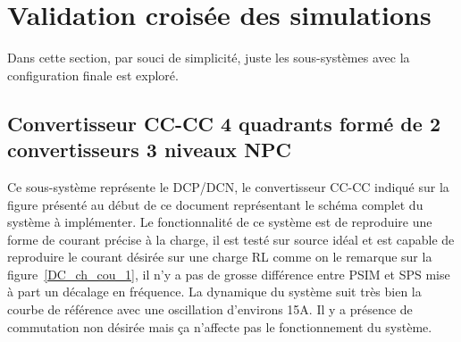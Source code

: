 \chapter{Validation croisée des simulations}
Dans cette section, par souci de simplicité, juste les sous-systèmes avec la configuration finale est exploré. 

\section{Convertisseur CC-CC 4 quadrants formé de 2 convertisseurs 3 niveaux NPC}
Ce sous-système représente le DCP/DCN, le convertisseur CC-CC indiqué sur la figure présenté au début de ce document représentant le schéma complet du système à implémenter. Le fonctionnalité de ce système est de reproduire une forme de courant précise à la charge, il est testé sur source idéal et est capable de  reproduire le courant désirée sur une charge RL comme on le remarque sur la figure~\ref{DC_ch_cou_1}, il n'y a pas de grosse différence entre PSIM et SPS mise à part un décalage en fréquence. La dynamique du système suit très bien la courbe de référence avec une oscillation d'environs 15A. Il y a présence de commutation non désirée mais ça n'affecte pas le fonctionnement du système. 



